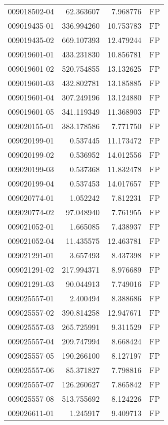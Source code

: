 \begin{tabular}{lrrl}
009018502-04 &   62.363607 &     7.968776 &   FP \\
009019435-01 &  336.994260 &    10.753783 &   FP \\
009019435-02 &  669.107393 &    12.479244 &   FP \\
009019601-01 &  433.231830 &    10.856781 &   FP \\
009019601-02 &  520.754855 &    13.132625 &   FP \\
009019601-03 &  432.802781 &    13.185885 &   FP \\
009019601-04 &  307.249196 &    13.124880 &   FP \\
009019601-05 &  341.119349 &    11.368903 &   FP \\
009020155-01 &  383.178586 &     7.771750 &   FP \\
009020199-01 &    0.537445 &    11.173472 &   FP \\
009020199-02 &    0.536952 &    14.012556 &   FP \\
009020199-03 &    0.537368 &    11.832478 &   FP \\
009020199-04 &    0.537453 &    14.017657 &   FP \\
009020774-01 &    1.052242 &     7.812231 &   FP \\
009020774-02 &   97.048940 &     7.761955 &   FP \\
009021052-01 &    1.665085 &     7.438937 &   FP \\
009021052-04 &   11.435575 &    12.463781 &   FP \\
009021291-01 &    3.657493 &     8.437398 &   FP \\
009021291-02 &  217.994371 &     8.976689 &   FP \\
009021291-03 &   90.044913 &     7.749016 &   FP \\
009025557-01 &    2.400494 &     8.388686 &   FP \\
009025557-02 &  390.814258 &    12.947671 &   FP \\
009025557-03 &  265.725991 &     9.311529 &   FP \\
009025557-04 &  209.747994 &     8.668424 &   FP \\
009025557-05 &  190.266100 &     8.127197 &   FP \\
009025557-06 &   85.371827 &     7.798816 &   FP \\
009025557-07 &  126.260627 &     7.865842 &   FP \\
009025557-08 &  513.755692 &     8.124226 &   FP \\
009026611-01 &    1.245917 &     9.409713 &   FP \\

\end{tabular}
